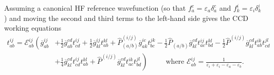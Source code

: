 \documentclass[11pt,fleqn]{article}
\renewcommand{\d}{\delta}    %
\newcommand{\e}{\varepsilon} %
\newcommand{\ol}[1]{\ensuremath{\overline{#1}}}
\newcommand{\op}[1]{\ensuremath{\hat{#1}}}
\renewcommand{\sp}{\hspace{30pt}}
\newcommand{\mc}[1]{\ensuremath{\mathcal{#1}}}
\theoremstyle{mystyle}
\begin{document}
Assuming a canonical HF reference wavefunction (so that $f_a^c=\e_a\d_a^c$ and $f_k^i=\e_i\d_k^i$) and moving the second and third terms to the left-hand side gives the CCD working equations
\begin{align}
  t_{ab}^{ij}
=
  \mc{E}_{ab}^{ij}
  \left(
    \ol{g}_{ab}^{ij}
  \right.
  &+
    \tfrac{1}{2}
    \ol{g}_{ab}^{cd}
    t_{cd}^{ij}
  +
    \tfrac{1}{2}
    \ol{g}_{kl}^{ij}
    t_{ab}^{kl}
  +
    \op{P}^{(i/j)}
          _{(a/b)}
    \ol{g}_{ak}^{ic}
    t_{bc}^{jk}
  -
    \tfrac{1}{2}
    \op{P}_{(a/b)}
    \ol{g}_{kl}^{cd}
    t_{ac}^{ij}t_{bd}^{kl}
  -
    \tfrac{1}{2}
    \op{P}^{(i/j)}
    \ol{g}_{kl}^{cd}
    t_{ab}^{ik}t_{cd}^{jl}
\\
  &+
  \left.
    \tfrac{1}{4}
    \ol{g}_{kl}^{cd}
    t_{cd}^{ij}t_{ab}^{kl}
  +
    \op{P}^{(i/j)}
    \ol{g}_{kl}^{cd}
    t_{ac}^{ik}t_{bd}^{jl}
  \right)
\sp\text{where $\mc{E}_{ab}^{ij}=\frac{1}{\e_i+\e_i-\e_a-\e_b}$.}
\end{align}
\end{document}
